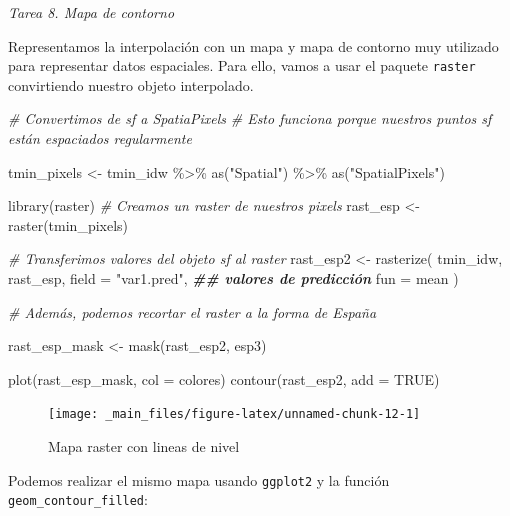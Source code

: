 \documentclass[
]{report}
\newenvironment{Shaded}{\begin{snugshade}}{\end{snugshade}}
\newcommand{\AttributeTok}[1]{\textcolor[rgb]{0.77,0.63,0.00}{#1}}
\newcommand{\CommentTok}[1]{\textcolor[rgb]{0.56,0.35,0.01}{\textit{#1}}}
\newcommand{\ConstantTok}[1]{\textcolor[rgb]{0.00,0.00,0.00}{#1}}
\newcommand{\DocumentationTok}[1]{\textcolor[rgb]{0.56,0.35,0.01}{\textbf{\textit{#1}}}}
\newcommand{\FunctionTok}[1]{\textcolor[rgb]{0.00,0.00,0.00}{#1}}
\newcommand{\NormalTok}[1]{#1}
\newcommand{\OtherTok}[1]{\textcolor[rgb]{0.56,0.35,0.01}{#1}}
\newcommand{\SpecialCharTok}[1]{\textcolor[rgb]{0.00,0.00,0.00}{#1}}
\newcommand{\StringTok}[1]{\textcolor[rgb]{0.31,0.60,0.02}{#1}}
\theoremstyle{definition}
\theoremstyle{definition}
\theoremstyle{definition}
\theoremstyle{definition}
\theoremstyle{remark}
\begin{document}
\emph{Tarea 8. Mapa de contorno}

Representamos la interpolación con un mapa y mapa de contorno muy utilizado para
representar datos espaciales. Para ello, vamos a usar el paquete \texttt{raster}
convirtiendo nuestro objeto interpolado.

\begin{Shaded}
\begin{Highlighting}[]
\CommentTok{\# Convertimos de sf a SpatiaPixels}
\CommentTok{\# Esto funciona porque nuestros puntos sf están espaciados regularmente}

\NormalTok{tmin\_pixels }\OtherTok{\textless{}{-}}\NormalTok{ tmin\_idw }\SpecialCharTok{\%\textgreater{}\%}
  \FunctionTok{as}\NormalTok{(}\StringTok{"Spatial"}\NormalTok{) }\SpecialCharTok{\%\textgreater{}\%}
  \FunctionTok{as}\NormalTok{(}\StringTok{"SpatialPixels"}\NormalTok{)}


\FunctionTok{library}\NormalTok{(raster)}
\CommentTok{\# Creamos un raster de nuestros pixels}
\NormalTok{rast\_esp }\OtherTok{\textless{}{-}} \FunctionTok{raster}\NormalTok{(tmin\_pixels)}

\CommentTok{\# Transferimos valores del objeto sf al raster}
\NormalTok{rast\_esp2 }\OtherTok{\textless{}{-}} \FunctionTok{rasterize}\NormalTok{(}
\NormalTok{  tmin\_idw,}
\NormalTok{  rast\_esp,}
  \AttributeTok{field =} \StringTok{"var1.pred"}\NormalTok{, }\DocumentationTok{\#\# valores de predicción}
  \AttributeTok{fun =}\NormalTok{ mean}
\NormalTok{)}

\CommentTok{\# Además, podemos recortar el raster a la forma de España}

\NormalTok{rast\_esp\_mask }\OtherTok{\textless{}{-}} \FunctionTok{mask}\NormalTok{(rast\_esp2, esp3)}

\FunctionTok{plot}\NormalTok{(rast\_esp\_mask, }\AttributeTok{col =}\NormalTok{ colores)}
\FunctionTok{contour}\NormalTok{(rast\_esp2, }\AttributeTok{add =} \ConstantTok{TRUE}\NormalTok{)}
\end{Highlighting}
\end{Shaded}

\begin{figure}

{\centering \texttt{[image: \_main\_files/figure-latex/unnamed-chunk-12-1]} 

}

\caption{Mapa raster con lineas de nivel}\label{fig:unnamed-chunk-12}
\end{figure}

Podemos realizar el mismo mapa usando \texttt{ggplot2} y la función
\texttt{geom\_contour\_filled}:
\end{document}
